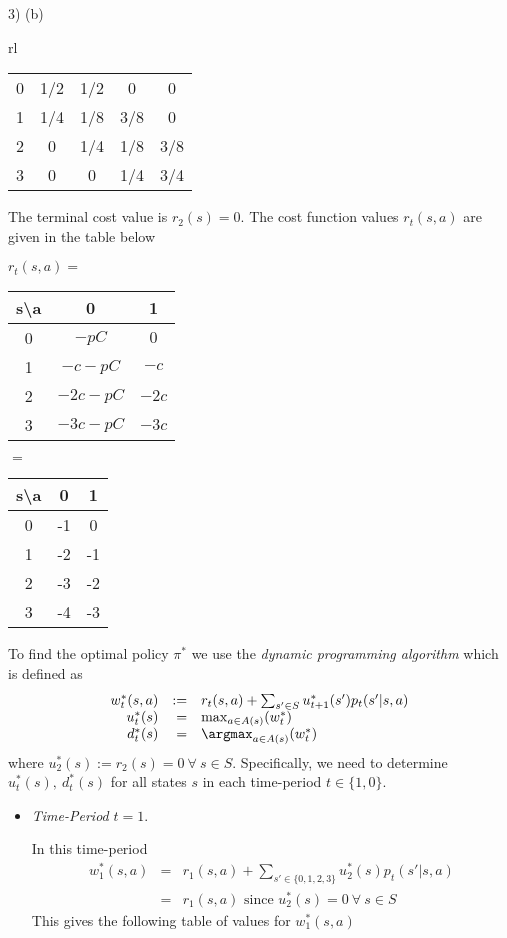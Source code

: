 \documentclass[11pt,a4paper]{article}
\begin{document}
\begin{answer}{3) (b)}
\begin{adjustwidth}{-2cm}{}
\begin{tabular}{rl}
\begin{tabular}{c|cccc}
        0&1/2&1/2&0&0\\
        1&1/4&1/8&3/8&0&\\
        2&0&1/4&1/8&3/8&\\
        3&0&0&1/4&3/4
      \end{tabular}
    \end{tabular}
  \end{adjustwidth}
  The terminal cost value is $r_2(s)=0$. The cost function values $r_t(s,a)$ are given in the table below
  \begin{center}
    $r_t(s,a)=$\begin{tabular}{c|cc}
      s\textbackslash a&0&1\\\hline
      0&$-pC$&$0$\\
      1&$-c-pC$&$-c$\\
      2&$-2c-pC$&$-2c$\\
      3&$-3c-pC$&$-3c$\\
    \end{tabular}
    $=$
    \begin{tabular}{c|cc}
      s\textbackslash a&0&1\\\hline
      0&-1&0\\
      1&-2&-1\\
      2&-3&-2\\
      3&-4&-3
    \end{tabular}
  \end{center}
  To find the optimal policy $\pi^*$ we use the \textit{dynamic programming algorithm} which is defined as
  \[\begin{array}{rrl}
    w_t^*(s,a)&:=&r_t(s,a)+\sum_{s'\in S}u_{t+1}^*(s')p_t(s'|s,a)\\
    u_t^*(s)&=&\max_{a\in A(s)}(w_t^*)\\
    d_t^*(s)&=&\argmax_{a\in A(s)}(w_t^*)
  \end{array}\]
  where $u_2^*(s):=r_2(s)=0\ \forall\ s\in S$. Specifically, we need to determine $u_t^*(s),\ d_t^*(s)$ for all states $s$ in each time-period $t\in\{1,0\}$.
  \begin{itemize}
    \item \textit{Time-Period} $t=1$.
    \par In this time-period
    \[\begin{array}{rcl}
      w_1^*(s,a)&=&r_1(s,a)+\sum_{s'\in\{0,1,2,3\}}u_2^*(s)p_t(s'|s,a)\\
      &=&r_1(s,a)\text{ since }u_2^*(s)=0\ \forall\ s\in S
    \end{array}\]
    This gives the following table of values for $w_1^*(s,a)$

\end{itemize}
\end{answer}
\end{document}
